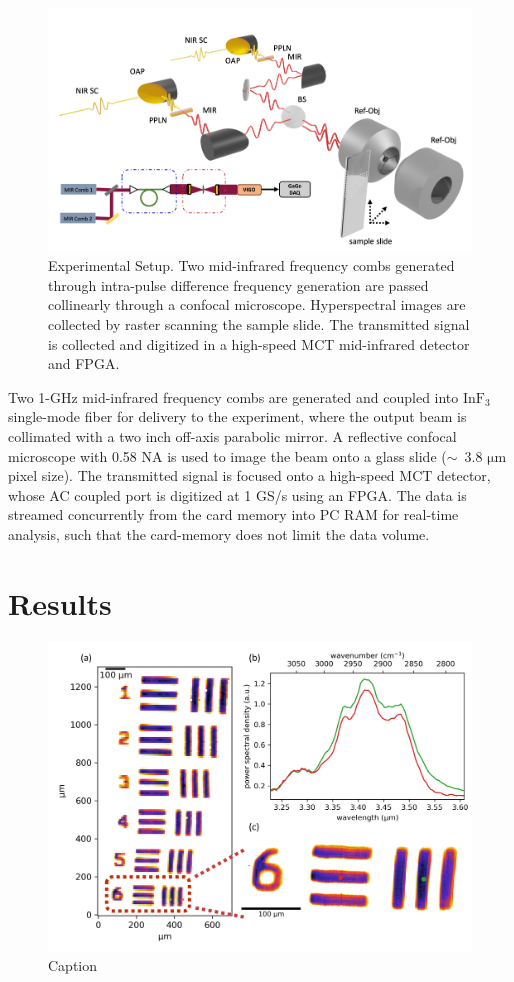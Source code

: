\documentclass{optica-article}
\begin{document}
\begin{figure}[h]
    \centering
    \includegraphics[width=\linewidth]{setup_3D.png}
    \caption{Experimental Setup. Two mid-infrared frequency combs generated through intra-pulse difference frequency generation are passed collinearly through a confocal microscope. Hyperspectral images are collected by raster scanning the sample slide. The transmitted signal is collected and digitized in a high-speed MCT mid-infrared detector and FPGA.}
    \label{fig:setup}
\end{figure}

Two 1-GHz mid-infrared frequency combs are generated and coupled into $\mathrm{InF_3}$ single-mode fiber for delivery to the experiment, where the output beam is collimated with a two inch off-axis parabolic mirror. A reflective confocal microscope with 0.58 NA is used to image the beam onto a glass slide ($\sim$~3.8 $\mathrm{\mu m}$ pixel size). The transmitted signal is focused onto a high-speed MCT detector, whose AC coupled port is digitized at 1 GS/s using an FPGA. The data is streamed concurrently from the card memory into PC RAM for real-time analysis, such that the card-memory does not limit the data volume. 

\section{Results}

\begin{figure}[h]
    \centering
    \includegraphics[width=\linewidth]{su8_image.png}
    \caption{Caption}
    \label{fig:su8}
\end{figure}
\end{document}
